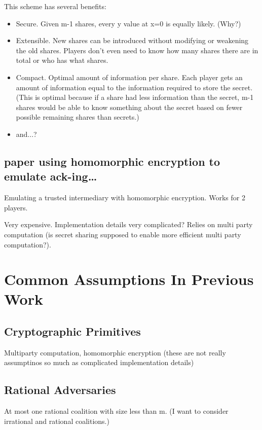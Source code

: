 \documentclass{article}
\begin{document}
This scheme has several benefits:
\begin{itemize}
	\item Secure. Given m-1 shares, every y value at x=0 is equally likely. (Why?)
	\item Extensible. New shares can be introduced without modifying or weakening the old shares. Players don't even need to know how many shares there are in total or who has what shares.
	\item Compact. Optimal amount of information per share. Each player gets an amount of information equal to the information required to store the secret. (This is optimal because if a share had less information than the secret, m-1 shares would be able to know something about the secret based on fewer possible remaining shares than secrets.)
	\item and...?
\end{itemize}

\subsection{paper using homomorphic encryption to emulate ack-ing\ldots}
Emulating a trusted intermediary with homomorphic encryption. Works for 2 players.

Very expensive. Implementation details very complicated? Relies on multi party computation (is secret sharing supposed to enable more efficient multi party computation?).

\section{Common Assumptions In Previous Work}
\subsection{Cryptographic Primitives}

Multiparty computation, homomorphic encryption (these are not really assumptinos so much as complicated implementation details)

\subsection{Rational Adversaries}

At most one rational coalition with size less than m. (I want to consider irrational and rational coalitions.)
\end{document}
